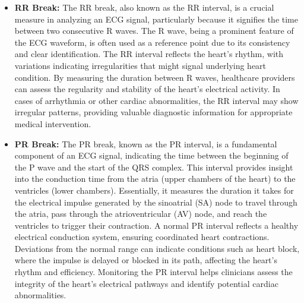 \begin{itemize}
    \item \textbf{RR Break:} The RR break, also known as the RR interval, is a crucial measure in analyzing an ECG signal, particularly because it signifies the time between two consecutive R waves. The R wave, being a prominent feature of the ECG waveform, is often used as a reference point due to its consistency and clear identification. The RR interval reflects the heart's rhythm, with variations indicating irregularities that might signal underlying heart condition\cite{arquilla2020textile}. By measuring the duration between R waves, healthcare providers can assess the regularity and stability of the heart's electrical activity. In cases of arrhythmia or other cardiac abnormalities, the RR interval may show irregular patterns, providing valuable diagnostic information for appropriate medical intervention.
\end{itemize}
\begin{itemize}
    \item \textbf{PR Break:} The PR break, known as the PR interval, is a fundamental component of an ECG signal, indicating the time between the beginning of the P wave and the start of the QRS complex. This interval provides insight into the conduction time from the atria (upper chambers of the heart) to the ventricles (lower chambers). Essentially, it measures the duration it takes for the electrical impulse generated by the sinoatrial (SA) node to travel through the atria, pass through the atrioventricular (AV) node, and reach the ventricles to trigger their contraction. A normal PR interval reflects a healthy electrical conduction system, ensuring coordinated heart contractions. Deviations from the normal range can indicate conditions such as heart block, where the impulse is delayed or blocked in its path, affecting the heart's rhythm and efficiency. Monitoring the PR interval helps clinicians assess the integrity of the heart's electrical pathways and identify potential cardiac abnormalities.
\end{itemize}
